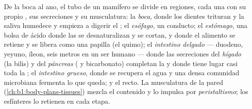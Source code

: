 \begin{proposition}\label{prop:b1:digestion-absorption:tract}
De la boca al ano, el tubo de un mamífero se divide en regiones, cada una
con su propio , sus secreciones y su musculatura: la \emph{boca},
donde los dientes trituran y la saliva humedece y empieza a digerir el
; el \emph{esófago}, un conducto; el \emph{estómago}, una bolsa de
ácido donde las  se desnaturalizan y se cortan, y donde el alimento
se retiene y se libera como una papilla (el quimo); el \emph{intestino
delgado} --- duodeno, yeyuno, íleon, seis metros en un ser humano --- donde
las secreciones del \emph{hígado} (la bilis) y del \emph{páncreas} (
y bicarbonato) completan la  y donde tiene lugar casi toda la
; el \emph{intestino grueso}, donde se recupera el agua y una densa
comunidad microbiana fermenta lo que queda; y el recto. La musculatura de la
pared (\cref{ch:b1:body-plans-tissues}) mezcla el contenido y lo impulsa por
\emph{peristaltismo}; los esfínteres lo retienen en cada etapa.
\end{proposition}

